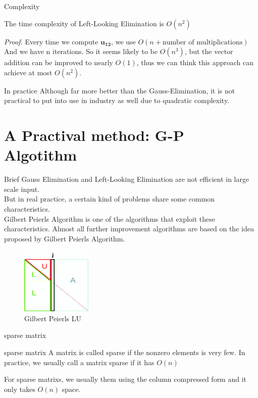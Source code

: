 \documentclass[9pt]{beamer}
\newcommand{\ccb}[1]{{\color{blue}#1}}
\newcommand{\ccp}[1]{{\color{purple}#1}}
\newcommand{\ccm}[1]{{\color{magenta}#1}}
\begin{document}
	\begin{frame}{Complexity}
		\begin{theorem}
			The time complexity of Left-Looking Elimination is \ccb{$O(n^2)$}
		\end{theorem}\pause\bigskip
		\ccm{\em Proof.} Every time we compute \ccb{$\pmb{u_{12}}$}, we use \ccb{$O(n+\text{number of multiplications})$}\\
		And we have n iterations. So it seems likely to be \ccb{$O(n^3)$}, but the vector addition can be improved to nearly \ccb{$O(1)$}, thus we can think this approach can achieve at most \ccb{$O(n^2)$}.\pause
		\begin{alertblock}{In practice}
			Although far more better than the Gauss-Elimination, it is not practical to put into use in industry as well due to quadratic complexity.
		\end{alertblock}
	\end{frame}

	\section{A Practival method: G-P Algotithm}
	\begin{frame}{Brief}
		\ccp{Gauss Elimination} and \ccp{Left-Looking Elimination} are not efficient in large scale input.\\
		But in real practice, a certain kind of problems share some common characteristics.\\ \pause\bigskip
		\ccp{Gilbert Peierls Algorithm} is one of the algorithms that exploit these characteristics.
		Almost all further improvement algorithms are based on the idea proposed by Gilbert Peierls Algorithm.
		\begin{figure}[h]
			\centering
			\includegraphics[width=0.3\textwidth]{figures/Gilbert-Peierls-LU.png}
			\caption{Gilbert Peierls LU}
		\end{figure}
	\end{frame}

	\begin{frame}{sparse matrix}
		\begin{definition}{sparse matrix}
			A matrix is called sparse if the nonzero elements is very few. In practice, we usually call a matrix sparse if it has \ccb{$O(n)$}
		\end{definition}\pause
	For sparse matrixs, we usually them using the column compressed form and it only takes \ccb{$O(n)$} space.
	\end{frame}
\end{document}
